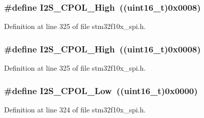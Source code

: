 \subsubsection[{\texorpdfstring{I2\+S\+\_\+\+C\+P\+O\+L\+\_\+\+High}{I2S_CPOL_High}}]{\setlength{\rightskip}{0pt plus 5cm}\#define I2\+S\+\_\+\+C\+P\+O\+L\+\_\+\+High~(({\bf uint16\+\_\+t})0x0008)}\hypertarget{group___i2_s___clock___polarity_gae26f7f9fbde299fbdc0b81a2cc38bfdb}{}\label{group___i2_s___clock___polarity_gae26f7f9fbde299fbdc0b81a2cc38bfdb}


Definition at line 325 of file stm32f10x\+\_\+spi.\+h.

\subsubsection[{\texorpdfstring{I2\+S\+\_\+\+C\+P\+O\+L\+\_\+\+High}{I2S_CPOL_High}}]{\setlength{\rightskip}{0pt plus 5cm}\#define I2\+S\+\_\+\+C\+P\+O\+L\+\_\+\+High~(({\bf uint16\+\_\+t})0x0008)}\hypertarget{group___i2_s___clock___polarity_gae26f7f9fbde299fbdc0b81a2cc38bfdb}{}\label{group___i2_s___clock___polarity_gae26f7f9fbde299fbdc0b81a2cc38bfdb}


Definition at line 325 of file stm32f10x\+\_\+spi.\+h.

\subsubsection[{\texorpdfstring{I2\+S\+\_\+\+C\+P\+O\+L\+\_\+\+Low}{I2S_CPOL_Low}}]{\setlength{\rightskip}{0pt plus 5cm}\#define I2\+S\+\_\+\+C\+P\+O\+L\+\_\+\+Low~(({\bf uint16\+\_\+t})0x0000)}\hypertarget{group___i2_s___clock___polarity_gae859a63575e4af3e007fc5123fa901ab}{}\label{group___i2_s___clock___polarity_gae859a63575e4af3e007fc5123fa901ab}


Definition at line 324 of file stm32f10x\+\_\+spi.\+h.

